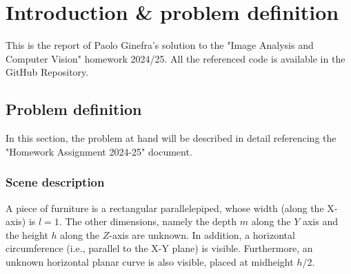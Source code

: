 \chapter*{Introduction \& problem definition}
This is the report of Paolo Ginefra's solution to the "Image Analysis and Computer Vision" homework 2024/25.
All the referenced code is available in the GitHub Repository.

\section{Problem definition}
In this section, the problem at hand will be described in detail referencing the "Homework Assignment 2024-25" document.
\subsection{Scene description}
 A piece of furniture is a rectangular parallelepiped, whose width (along the X-axis) is $l = 1$. 
The other dimensions, namely the depth $m$ along the $Y$ axis and the height $h$ along the $Z$-axis are 
unknown. In addition, a horizontal circumference (i.e., parallel to the X-Y plane) is visible. 
Furthermore, an unknown horizontal planar curve is also visible, placed at midheight $h$/2. 

